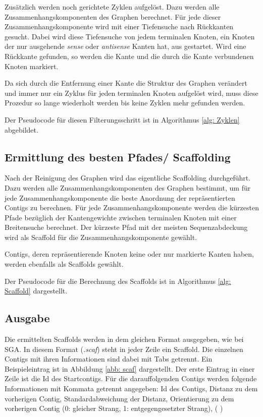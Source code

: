 \documentclass[a4paper,10pt,parskip]{scrartcl}
\begin{document}
Zusätzlich werden noch gerichtete Zyklen aufgelöst. Dazu werden alle
Zusammenhangskomponenten des Graphen berechnet. Für jede dieser
Zusammenhangskomponente wird mit einer Tiefensuche nach Rückkanten
gesucht. Dabei wird diese Tiefensuche von jedem terminalen Knoten, ein
Knoten der nur ausgehende \textit{sense} oder \textit{antisense}
Kanten hat, aus gestartet. Wird eine Rückkante gefunden, so werden die
Kante und die durch die Kante verbundenen Knoten markiert.

Da sich durch die Entfernung einer Kante die Struktur des Graphen
verändert und immer nur ein Zyklus für jeden terminalen Knoten
aufgelöst wird, muss diese Prozedur so lange wiederholt werden bis
keine Zyklen mehr gefunden werden.

Der Pseudocode für diesen Filterungsschritt ist in Algorithmus
\ref{alg: Zyklen} abgebildet.

\subsection{Ermittlung des besten Pfades/ Scaffolding}

Nach der Reinigung des Graphen wird das eigentliche Scaffolding
durchgeführt. Dazu werden alle Zusammenhangskomponenten des Graphen
bestimmt, um für jede Zusammenhangskomponente die beste Anordnung der
repräsentierten Contigs zu berechnen. Für jede Zusammenhangskomponente
werden die kürzesten Pfade bezüglich der Kantengewichte zwischen
terminalen Knoten mit einer Breitensuche berechnet. Der kürzeste Pfad
mit der meisten Sequenzabdeckung wird als Scaffold für die
Zusammenhangskomponente gewählt.

Contigs, deren repräsentierende Knoten keine oder nur markierte Kanten
haben, werden ebenfalls als Scaffolds gewählt.

Der Pseudocode für die Berechnung des Scaffolds ist in Algorithmus
\ref{alg: Scaffold} dargestellt.

\subsection{Ausgabe}
Die ermittelten Scaffolds werden in dem gleichen Format ausgegeben,
wie bei SGA. In diesem Format (\textit{.scaf}) steht in jeder Zeile
ein Scaffold. Die einzelnen Contigs mit ihren Informationen sind dabei
mit Tabs getrennt. Ein Beispieleintrag ist in Abbildung \ref{abb:
  scaf} dargestellt. Der erste Eintrag in einer Zeile ist die Id des
Startcontigs. Für die darauffolgenden Contigs werden folgende
Informationen mit Kommata getrennt angegeben: Id des Contigs, Distanz
zu dem vorherigen Contig, Standardabweichung der Distanz, Orientierung
zu dem vorherigen Contig (0: gleicher Strang, 1: entgegengesetzter
Strang), ( )
\end{document}
